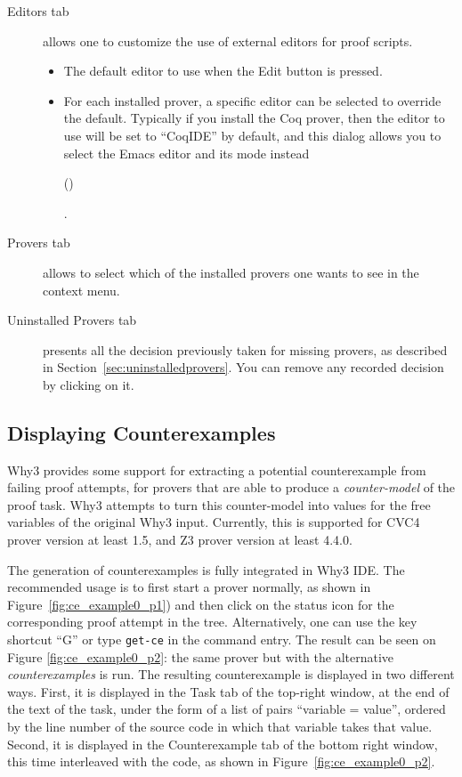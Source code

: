 \begin{description}
\item[\textsf{Editors} tab] allows one to customize the use
  of external editors for proof scripts.
\begin{itemize}
\item The default editor to use when the \textsf{Edit} button is
  pressed.
\item For each installed prover, a specific editor can be selected to
  override the default. Typically if you install the Coq prover, then
  the editor to use will be set to ``CoqIDE'' by default, and this
  dialog allows you to select the Emacs editor and its
  mode instead%
 \begin{latexonly} (\urlprfgen)\end{latexonly}.
\end{itemize}
\item[\textsf{Provers} tab]
  allows to select which of the installed provers one wants to see
  in the context menu.
\item[\textsf{Uninstalled Provers} tab] presents all the
  decision previously taken for missing provers, as described in
  Section~\ref{sec:uninstalledprovers}. You can remove any recorded
  decision by clicking on it.
\end{description}

\subsection{Displaying Counterexamples}
\label{sec:idece}

Why3 provides some support for extracting a potential counterexample
from failing proof attempts, for provers that are able to produce a
\emph{counter-model} of the proof task. Why3 attempts to turn this
counter-model into values for the free variables of the original Why3
input. Currently, this is supported for CVC4 prover version at least
1.5, and Z3 prover version at least 4.4.0.

The generation of counterexamples is fully integrated in Why3 IDE. The
recommended usage is to first start a prover normally, as shown in
Figure~\ref{fig:ce_example0_p1}) and then click on the status icon for
the corresponding proof attempt in the tree. Alternatively, one can
use the key shortcut ``G'' or type \texttt{get-ce} in the command
entry. The result can be seen on Figure \ref{fig:ce_example0_p2}: the
same prover but with the alternative \emph{counterexamples} is
run. The resulting counterexample is displayed in two different
ways. First, it is displayed in the \textsf{Task} tab of the top-right
window, at the end of the text of the task, under the form of a list
of pairs ``variable = value'', ordered by the line number of the
source code in which that variable takes that value. Second, it is
displayed in the \textsf{Counterexample} tab of the bottom right
window, this time interleaved with the code, as shown in Figure~\ref{fig:ce_example0_p2}.

